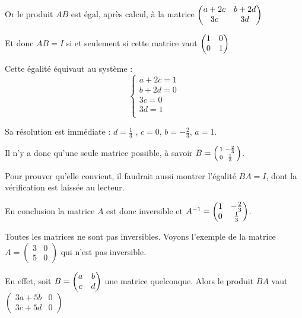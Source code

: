 \change
Or le produit $AB$ est égal, après calcul, à la matrice  $\begin{pmatrix}
a+2c & b+2d \cr
3c & 3d\cr
\end{pmatrix}$

\change
Et donc $AB=I$ si et seulement si cette matrice vaut 
$\begin{pmatrix}
1 & 0 \cr
0 & 1\cr
\end{pmatrix}
$

\change
Cette égalité équivaut au système  : 
$$\left \{ \begin{array}{l}
a+2c=1\\
b+2d=0\\
3c=0\\
3d=1\\
\end{array} \right .$$

Sa résolution est immédiate : $d=\frac13$ , $c=0$, $b=-\frac23$, $a=1$.

\change

Il n'y a donc qu'une seule matrice possible, à savoir 
$B=\left(\begin{smallmatrix}
1 & -\frac23 \cr
0 & \frac13\cr
\end{smallmatrix}\right)$.

\change
Pour prouver qu'elle convient, il faudrait aussi montrer l'égalité $BA=I$,
dont la vérification est laissée au lecteur.

\change

En conclusion la matrice $A$ est donc inversible et $A^{-1}= \begin{pmatrix}
1 & -\frac23 \cr
0 & \frac13\cr
\end{pmatrix}$.



\diapo

Toutes les matrices ne sont pas inversibles.
Voyons l'exemple de la matrice 
$ A = \left(\begin{smallmatrix}
3 & 0\\
5 & 0\end{smallmatrix}\right)$
qui n'est pas inversible. 

\change
En effet, soit
$B= \begin{pmatrix}
a & b \cr
c & d\cr
\end{pmatrix}$ une matrice quelconque. 
Alors le produit $ BA$ vaut  $
\begin{pmatrix}
3a+5b & 0\\
3c+5d      & 0
\end{pmatrix}$

